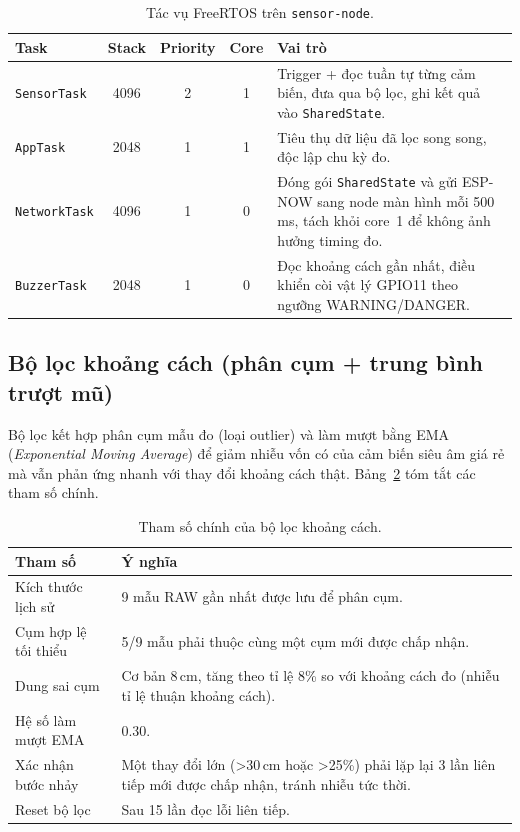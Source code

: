 \documentclass[a4paper,12pt]{article}
\newcommand{\code}[1]{\texttt{#1}}
\begin{document}
\begin{table}[H]
\centering
\small
\begin{tabular}{@{}lccc p{5.4cm}@{}}
\toprule
\textbf{Task} & \textbf{Stack} & \textbf{Priority} & \textbf{Core} & \textbf{Vai trò} \\
\midrule
\code{SensorTask} & 4096 & 2 & 1 & Trigger + đọc tuần tự từng cảm biến, đưa qua bộ lọc, ghi kết quả vào \code{SharedState}. \\
\code{AppTask} & 2048 & 1 & 1 & Tiêu thụ dữ liệu đã lọc song song, độc lập chu kỳ đo. \\
\code{NetworkTask} & 4096 & 1 & 0 & Đóng gói \code{SharedState} và gửi ESP-NOW sang node màn hình mỗi 500\,ms, tách khỏi core~1 để không ảnh hưởng timing đo. \\
\code{BuzzerTask} & 2048 & 1 & 0 & Đọc khoảng cách gần nhất, điều khiển còi vật lý GPIO11 theo ngưỡng WARNING/DANGER. \\
\bottomrule
\end{tabular}
\caption{Tác vụ FreeRTOS trên \code{sensor-node}.}
\label{tab:tasks-sensor}
\end{table}

\subsection{Bộ lọc khoảng cách (phân cụm + trung bình trượt mũ)}

Bộ lọc kết hợp phân cụm mẫu đo (loại outlier) và làm mượt bằng EMA (\emph{Exponential Moving Average}) để giảm nhiễu vốn có của cảm biến siêu âm giá rẻ mà vẫn phản ứng nhanh với thay đổi khoảng cách thật. Bảng~\ref{tab:filter} tóm tắt các tham số chính.

\begin{table}[H]
\centering
\small
\begin{tabular}{@{}lp{9.6cm}@{}}
\toprule
\textbf{Tham số} & \textbf{Ý nghĩa} \\
\midrule
Kích thước lịch sử & 9 mẫu RAW gần nhất được lưu để phân cụm. \\
Cụm hợp lệ tối thiểu & 5/9 mẫu phải thuộc cùng một cụm mới được chấp nhận. \\
Dung sai cụm & Cơ bản 8\,cm, tăng theo tỉ lệ 8\% so với khoảng cách đo (nhiễu tỉ lệ thuận khoảng cách). \\
Hệ số làm mượt EMA & 0.30. \\
Xác nhận bước nhảy & Một thay đổi lớn (>30\,cm hoặc >25\%) phải lặp lại 3 lần liên tiếp mới được chấp nhận, tránh nhiễu tức thời. \\
Reset bộ lọc & Sau 15 lần đọc lỗi liên tiếp. \\
\bottomrule
\end{tabular}
\caption{Tham số chính của bộ lọc khoảng cách.}
\label{tab:filter}
\end{table}
\end{document}
